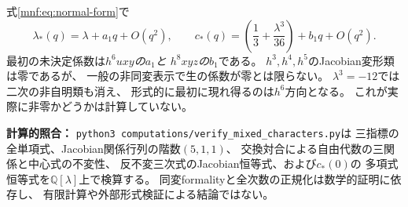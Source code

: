\begin{remark}[最初の未決定係数と判別点]
式\eqref{mnf:eq:normal-form}で
\[
 \lambda_*(q)=\lambda+a_1q+O(q^2),\qquad
 c_*(q)=\left(\frac13+\frac{\lambda^3}{36}\right)+b_1q+O(q^2).
\]
最初の未決定係数は\emph{$h^6uxy$の$a_1$と
$h^8xyz$の$b_1$}である。
$h^3,h^4,h^5$のJacobian変形類は零であるが、
一般の非同変表示で生の係数が零とは限らない。
$\lambda^3=-12$では二次の非自明類も消え、
形式的に最初に現れ得るのは$h^6$方向となる。
これが実際に非零かどうかは計算していない。
\end{remark}

\noindent
\textbf{計算的照合：}
\texttt{python3 computations/verify\_mixed\_characters.py}は
三指標の全単項式、Jacobian関係行列の階数$(5,1,1)$、
交換対合による自由代数の三関係と中心式の不変性、
反不変三次式のJacobian恒等式、および$c_*(0)$の
多項式恒等式を$\mathbb Q[\lambda]$上で検算する。
同変formalityと全次数の正規化は数学的証明に依存し、
有限計算や外部形式検証による結論ではない。
